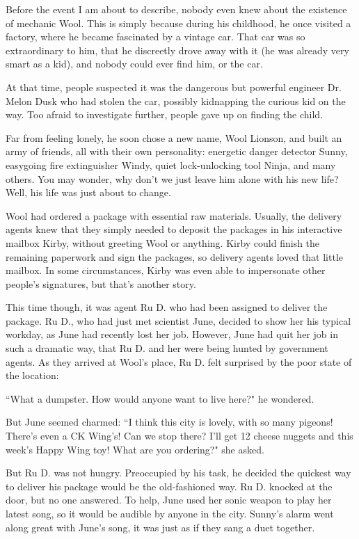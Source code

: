 
Before the event I am about to describe, nobody even knew about the existence of mechanic Wool.
This is simply because during his childhood, he once visited a factory, where he became fascinated by a vintage car. 
That car was so extraordinary to him, that he discreetly drove away with it (he was already very smart as a kid), and nobody could ever find him, or the car. 


At that time, people suspected it was the dangerous but powerful engineer Dr. Melon Dusk who had stolen the car, possibly kidnapping the curious kid on the way. Too afraid to investigate further, people gave up on finding the child.


Far from feeling lonely, he soon chose a new name, Wool Lionson, and built an army of friends, all with their own personality: energetic danger detector Sunny, easygoing fire extinguisher Windy, quiet lock-unlocking tool Ninja, and many others.
You may wonder, why don't we just leave him alone with his new life?
Well, his life was just about to change. 


Wool had ordered a package with essential raw materials.
Usually, the delivery agents knew that they simply needed to deposit the packages in his interactive mailbox Kirby, without greeting Wool or anything. Kirby could finish the remaining paperwork and sign the packages, so delivery agents loved that little mailbox. In some circumstances, Kirby was even able to impersonate other people's signatures, but that's another story.


This time though, it was agent Ru D. who had been assigned to deliver the package. 
Ru D., who had just met scientist June, decided to show her his typical workday, as June had recently lost her job.
However, June had quit her job in such a dramatic way, that Ru D. and her were being hunted by government agents.
As they arrived at Wool's place, Ru D. felt surprised by the poor state of the location: 

``What a dumpster. How would anyone want to live here?" he wondered. 

But June seemed charmed: ``I think this city is lovely, with so many pigeons! There's even a CK Wing's! Can we stop there? I'll get 12 cheese nuggets and this week's Happy Wing toy! What are you ordering?" she asked.

But Ru D. was not hungry. Preoccupied by his task, he decided the quickest way to deliver his package would be the old-fashioned way. 
Ru D. knocked at the door, but no one answered. To help, June used her sonic weapon to play her latest song, so it would be audible by anyone in the city.
Sunny's alarm went along great with June's song, it was just as if they sang a duet together.


